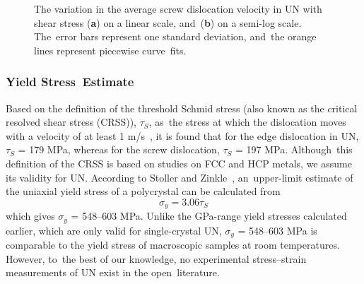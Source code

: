 \documentclass[applsci,article,accept,pdftex,moreauthors]{Definitions/mdpi}
\newcommand{\?}{\stackrel{?}{=}}
\begin{document}
\begin{figure}[H]
{\captionsetup{position=bottom,justification=centering}
\hfill
{}
}

\caption{The variation in the average screw dislocation velocity in UN with shear stress (\textbf{a}) on a linear scale, and~(\textbf{b}) on a semi-log scale. The~error bars represent one standard deviation, and~the orange lines represent piecewise curve~fits.}
\label{Fig:DislocPosTimeScrew}
\end{figure}

\subsubsection{Yield Stress~Estimate}

Based on the definition of the threshold Schmid stress (also known as the critical resolved shear stress (CRSS)), $\tau_S$, as~the stress at which the dislocation moves with a velocity of at least 1 m/s~\cite{Murty2013}, it is found that for the edge dislocation in UN, $\tau_S$ = 179 MPa, whereas for the screw dislocation, $\tau_S$ = 197 MPa. Although~this definition of the CRSS is based on studies on FCC and HCP metals, we assume its validity for UN. According to Stoller and Zinkle~\cite{Stoller2000}, an~upper-limit estimate of the uniaxial yield stress of a polycrystal can be calculated from
\begin{equation}
\sigma_y = 3.06 \tau_S
\label{Eq:Taylor}
\end{equation}
which gives $\sigma_y$ = 548--603 MPa. Unlike the GPa-range yield stresses calculated earlier, which are only valid for single-crystal UN, $\sigma_y$ = 548--603 MPa is comparable to the yield stress of macroscopic samples at room temperatures. However, to~the best of our knowledge, no experimental stress--strain measurements of UN exist in the open~literature.
\end{document}
